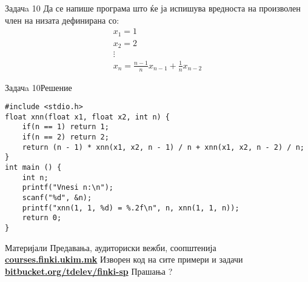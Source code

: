 \begin{frame}{Задачa 10}
Да се напише програма што ќе ја испишува вредноста на произволен член на
низата дефинирана со:
\[
   \begin{array}{l}
   x_1 = 1\\
   x_2 = 2\\ 
   \vdots\\
   x_n = \frac{n - 1}{n}x_{n - 1} + \frac{1}{n}x_{n - 2}
   \end{array}
\]
\end{frame}


\begin{frame}[fragile]{Задачa 10}{Решение}
\begin{lstlisting}
#include <stdio.h>
float xnn(float x1, float x2, int n) {
    if(n == 1) return 1;
    if(n == 2) return 2;
    return (n - 1) * xnn(x1, x2, n - 1) / n + xnn(x1, x2, n - 2) / n;
}
int main () {
    int n;
    printf("Vnesi n:\n");
    scanf("%d", &n);
    printf("xnn(1, 1, %d) = %.2f\n", n, xnn(1, 1, n));
    return 0;
}
\end{lstlisting}
\end{frame}

\begin{frame}{Материјали}{}
    Предавања, аудиториски вежби, соопштенија\\
    \href{http://courses.finki.ukim.mk/}{\textbf{courses.finki.ukim.mk}}
    \vfill
    Изворен код на сите примери и задачи\\
    \href{http://bitbucket.org/tdelev/finki-sp/}{\textbf{bitbucket.org/tdelev/finki-sp}}
    \vfill
    {\Huge Прашања ?}
\end{frame}
